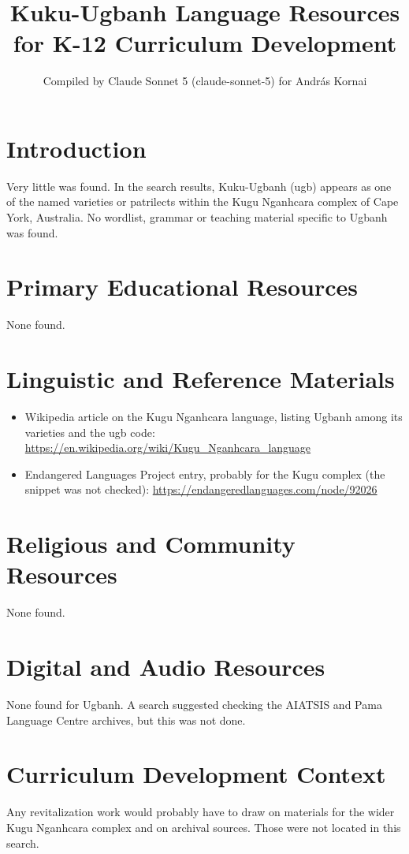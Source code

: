 \documentclass[12pt]{article}
\title{Kuku-Ugbanh Language Resources for K-12 Curriculum Development}
\author{Compiled by Claude Sonnet 5 (claude-sonnet-5) for Andr\'as Kornai}
\date{}
\begin{document}
\maketitle
\section{Introduction}
Very little was found. In the search results, Kuku-Ugbanh (ugb) appears as one of the named varieties or patrilects within the Kugu Nganhcara complex of Cape York, Australia. No wordlist, grammar or teaching material specific to Ugbanh was found.
\section{Primary Educational Resources}
None found.
\section{Linguistic and Reference Materials}
\begin{itemize}
\item Wikipedia article on the Kugu Nganhcara language, listing Ugbanh among its varieties and the ugb code: \url{https://en.wikipedia.org/wiki/Kugu_Nganhcara_language}
\item Endangered Languages Project entry, probably for the Kugu complex (the snippet was not checked): \url{https://endangeredlanguages.com/node/92026}
\end{itemize}
\section{Religious and Community Resources}
None found.
\section{Digital and Audio Resources}
None found for Ugbanh. A search suggested checking the AIATSIS and Pama Language Centre archives, but this was not done.
\section{Curriculum Development Context}
Any revitalization work would probably have to draw on materials for the wider Kugu Nganhcara complex and on archival sources. Those were not located in this search.
\end{document}
